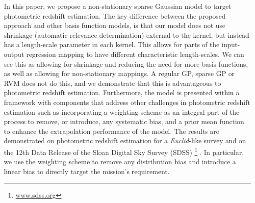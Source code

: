 \documentclass[useAMS,usenatbib,fleqn]{mn2e}
\begin{document}
In this paper, we propose a non-stationary sparse Gaussian model to target photometric redshift estimation. The key difference between the proposed approach and other basis function models, is that our model does not use shrinkage (automatic relevance determination) external to the kernel, but instead has a length-scale parameter in each kernel. This allows for parts of the input-output regression mapping to have different characteristic length-scales. We can see this as allowing for shrinkage and reducing the need for more basis functions, as well as allowing for non-stationary mappings. A regular GP, sparse GP or RVM does not do this, and we demonstrate that this is advantageous to photometric redshift estimation. Furthermore, the model is presented within a framework with components that address other challenges in photometric redshift estimation such as incorporating a weighting scheme as an integral part of the process to remove, or introduce, any systematic bias, and a prior mean function to enhance the extrapolation performance of the model. The results are demonstrated on photometric redshift estimation for a {\em Euclid}-like survey \citep{laureijs2011} and on the 12th Data Release of the Sloan Digital Sky Survey (SDSS) \citep{SDSS3}\footnote{\url{www.sdss.org}} . In particular, we use the weighting scheme to remove any distribution bias and introduce a linear bias to directly target the mission's requirement. 
\end{document}
